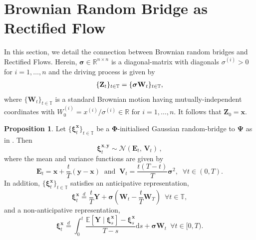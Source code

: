 \documentclass{article}
\def\T{\mathbb{T}}
\theoremstyle{definition}
\newtheorem{proposition}{Proposition}[section]
\begin{document}
\section{Brownian Random Bridge as Rectified Flow}\label{sec:brownian}
In this section, we detail the connection between Brownian random bridges and Rectified Flows. Herein, $\boldsymbol{\sigma} \in \mathbb{R}^{n \times n}$ is a diagonal-matrix with diagonals $\sigma^{(i)} > 0$ for $i=1, \dots, n$ and the driving process is given by
\begin{align}
\{\mathbf{Z}_t\}_{t \in \mathbb{T}} = \{\boldsymbol{\sigma}\mathbf{W}_t\}_{t \in \mathbb{T}}, \notag
\end{align}
where $\{\mathbf{W}_t\}_{t \in \mathbb{T}}$ is a standard Brownian motion having mutually-independent coordinates with $W^{(i)}_0 = x^{(i)}/\sigma^{(i)} \in \mathbb{R}$ for $i=1, \dots, n$. It follows that $\mathbf{Z}_0 = \boldsymbol{x}$. %
\begin{proposition}
\label{prop:bridge_stats}
Let $\{\boldsymbol{\xi}^{\boldsymbol{x}}_t\}_{t \in \mathbb{T}}$ be a $\boldsymbol{\Phi}$-initialised Gaussian random-bridge to $\boldsymbol{\Psi}$ as in \cite{goria_random-bridges_2025}. Then
    \begin{equation*}
        \boldsymbol{\xi}^{\boldsymbol{x},\boldsymbol{y}}_t \sim \mathcal{N}(\boldsymbol{E}_t, \, \boldsymbol{V}_t) \, ,
    \end{equation*}
    where the mean and variance functions are given by
    \begin{equation*}
        \boldsymbol{E}_t = \boldsymbol{x} + \frac{t}{T}(\boldsymbol{y} - \boldsymbol{x}) \;\; \text{and} \;\; \boldsymbol{V}_t = \frac{t(T-t)}{T}\boldsymbol{\sigma}^2, \;\; \forall t \in (0, T). \label{eq:bridge_mean_var}
    \end{equation*}
    In addition, $\{\boldsymbol{\xi}^{\boldsymbol{x}}_t\}_{t \in \mathbb{T}}$ satisfies an anticipative representation,
    \begin{equation*}
        \boldsymbol{\xi}^{\boldsymbol{x}}_t \overset{d}{=} \frac{t}{T}\boldsymbol{Y} +  \boldsymbol{\sigma}\left(\mathbf{W}_t - \frac{t}{T}\mathbf{W}_T \right) \,\,\, \forall t\in\T,
    \end{equation*}
    and a non-anticipative representation,
    \begin{equation}
        \boldsymbol{\xi}^{\boldsymbol{x}}_t \overset{d}{=} \int_0^t \frac{\mathbb{E}[\boldsymbol{Y} \mid \boldsymbol{\xi}^{\boldsymbol{x}}_s] - \boldsymbol{\xi}^{\boldsymbol{x}}_s}{T-s} \mathrm{d} s + \boldsymbol{\sigma}\mathbf{W}_t \,\,\, \forall t \in [0, T). \label{eq:rep_integral_2}
    \end{equation}
\end{proposition}
\end{document}
